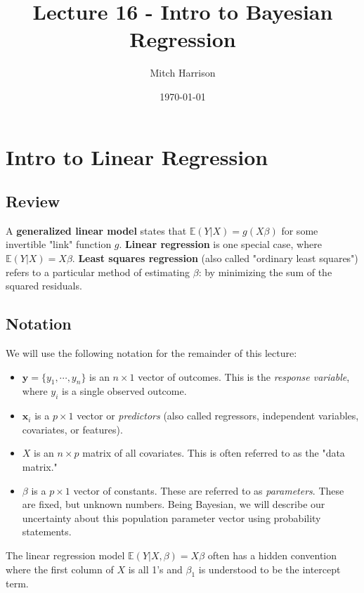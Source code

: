 \documentclass[titlepage, 12pt, leqno]{article}
\title{\Huge{Lecture 16 - Intro to Bayesian Regression}}
\author{\large{Mitch Harrison}}
\date{\today}
\begin{document}
\setlength{\parskip}{1\baselineskip}
\setlength{\parindent}{15pt}
\maketitle
\tableofcontents
\newpage


\section{Intro to Linear Regression}

\subsection{Review}
A \textbf{generalized linear model} states that $\mathbb{E}(Y|X) = g(X\beta)$
for some invertible "link" function $g$. \textbf{Linear regression} is one
special case, where $\mathbb{E}(Y|X) = X\beta$. \textbf{Least squares regression}
(also called "ordinary least squares") refers to a particular method of
estimating $\beta$: by minimizing the sum of the squared residuals.

\subsection{Notation}
We will use the following notation for the remainder of this lecture:
\begin{itemize}
    \item $\textbf{y}=\{y_{1}, \cdots ,y_{n}\}$ is an $n\times 1$ vector of
        outcomes. This is the \textit{response variable}, where $y_{i}$ is a
        single observed outcome.
    \item $\textbf{x}_{i}$ is a $p\times 1$ vector or \textit{predictors} (also
        called regressors, independent variables, covariates, or features).
    \item $X$ is an $n\times p$ matrix of all covariates. This is often referred
        to as the "data matrix."
    \item $\beta$ is a $p \times 1$ vector of constants. These are referred to
        as \textit{parameters}. These are fixed, but unknown numbers. Being
        Bayesian, we will describe our uncertainty about this population
        parameter vector using probability statements.
\end{itemize}
\begin{note}
    The linear regression model $\mathbb{E}(Y|X,\beta) = X\beta$ often has a
    hidden convention where the first column of $X$ is all 1's and $\beta_{1}$
    is understood to be the intercept term.
\end{note}
\end{document}
